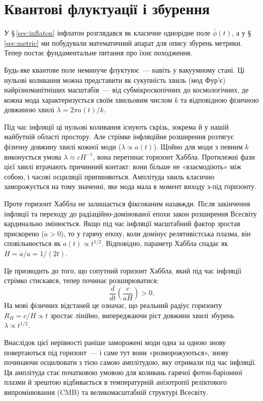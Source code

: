 \chapter{Квантові флуктуації і збурення}
\label{sec:quantum}

У §\,\ref{sec:inflaton} інфлатон розглядався як класичне однорідне
поле $\bar{\phi}(t)$, а у §\,\ref{sec:metric} ми побудували математичний апарат
для опису збурень метрики. Тепер постає фундаментальне питання про
їхнє походження.

Будь-яке квантове
поле неминуче флуктуює~--- навіть у вакуумному стані. Ці нульові коливання
можна представити як сукупність хвиль (мод Фур'є) найрізноманітніших масштабів~---
від субмікроскопічних до космологічних, де кожна мода характеризується своїм
хвильовим числом $k$ та відповідною фізичною довжиною хвилі $\lambda = 2\pi a(t)/k$.

Під час інфляції ці нульові коливання існують скрізь, зокрема й у нашій
майбутній області простору. Але стрімке інфляційне розширення розтягує
фізичну довжину хвилі кожної моди ($\lambda \propto a(t)$). Щойно для моди
з певним $k$ виконується умова $\lambda \approx cH^{-1}$, вона перетинає горизонт
Хаббла. Протилежні фази цієї хвилі втрачають причинний контакт: вони більше не «взаємодіють» між
собою, і часові осциляції припиняються. Амплітуда хвиль класично
заморожується на тому значенні, яке мода мала в момент виходу з-під горизонту.

Проте горизонт Хаббла не залишається фіксованим назавжди. Після закінчення
інфляції та переходу до радіаційно-домінованої епохи закон розширення Всесвіту
кардинально змінюється. Якщо під час інфляції масштабний фактор зростав
прискорено ($\ddot{a} > 0$), то у гарячу епоху, коли домінує релятивістська
плазма, він сповільнюється як $a(t) \propto t^{1/2}$. Відповідно, параметр
Хаббла спадає як $H = \dot{a}/a = 1/(2t)$.

Це призводить до того, що сопутний горизонт Хаббла, який під час інфляції
стрімко стискався, тепер починає розширюватися:
\begin{equation}
\frac{d}{dt} \left( \frac{c}{aH} \right) > 0.
\label{eq:horizon_growth}
\end{equation}
На мові фізичних відстаней це означає, що реальний радіус горизонту
$R_H = c/H \propto t$ зростає лінійно, випереджаючи ріст довжини хвилі
збурень $\lambda \propto t^{1/2}$.


Внаслідок цієї нерівності раніше заморожені моди одна за одною знову
повертаються під горизонт~--- і саме тут вони «розморожуються», знову
починаючи осцилювати з тією самою амплітудою, яку отримали під час інфляції.
Ця амплітуда стає початковою умовою для коливань гарячої фотон-баріонної
плазми й зрештою відбивається в температурній анізотропії реліктового
випромінювання (CMB) та великомасштабній структурі Всесвіту.


